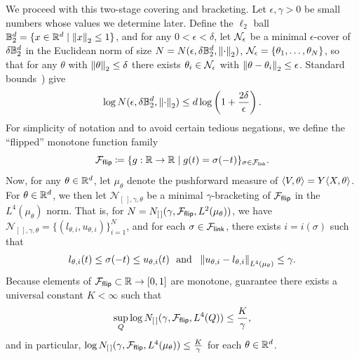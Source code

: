 We proceed with this two-stage covering and bracketing.
Let $\epsilon, \gamma > 0$ be small numbers whose values we determine
later.
Define the $\ell_2$ ball $\mathbb{B}_2^d = \{x \in \mathbb{R}^d \mid  \left\|{x}\right\|_2 \le 1\}$,
and for any $0 < \epsilon < \delta$, let
$\mathcal{N}_\epsilon$ be a minimal $\epsilon$-cover of $\delta \mathbb{B}_2^d$
in the Euclidean norm
of size $N = N(\epsilon, \delta \mathbb{B}_2^d, \left\|{\cdot}\right\|_2)$,
$\mathcal{N}_\epsilon = \{\theta_1, \ldots, \theta_N\}$, so that for
any $\theta$ with $\left\|{\theta}\right\|_2 \le \delta$ there exists
$\theta_i \in \mathcal{N}_\epsilon$ with $\left\|{\theta - \theta_i}\right\|_2 \le \epsilon$.
Standard bounds~\cite[Lemma~5.7]{Wainwright19}) give
\begin{align}
	\label{eqn:ball-covering-number}
	\log N(\epsilon, \delta \mathbb{B}_2^d, \left\|{\cdot}\right\|_2)
	\le d \log \left({1 + \frac{2\delta}{\epsilon}}\right).
\end{align}
For simplicity of notation and to avoid certain tedious negations, we define
the ``flipped'' monotone function family
\begin{equation*}
	\mathcal{F}_{\mathsf{flip}} \coloneqq \{g : \mathbb{R} \to \mathbb{R} \mid g(t) = \sigma(-t)\}_{
		\sigma \in \mathcal{F}_{\mathsf{link}}}.
\end{equation*}
Now, for any $\theta \in \mathbb{R}^d$, let
$\mu_\theta$
denote the pushforward measure of $\langle V, \theta\rangle = Y\langle X, \theta\rangle$.
For $\theta \in \mathbb{R}^d$, we then let
$\mathcal{N}_{[\,],\gamma, \theta}$ be a minimal
$\gamma$-bracketing of
$\mathcal{F}_{\mathsf{flip}}$
in the  $L^4(\mu_{\theta})$ norm. That is,
for $N = N_{[\,]}(\gamma, \mathcal{F}_{\mathsf{flip}}, L^2(\mu_\theta))$, we have
$\mathcal{N}_{[\,], \gamma, \theta}
= \{(l_{\theta, i}, u_{\theta, i})\}_{i = 1}^{N}$,
and for each $\sigma \in \mathcal{F}_{\mathsf{link}}$,
there exists $i = i(\sigma)$ such that
\begin{align*}
	l_{\theta, i}(t) \leq
	\sigma(-t) \leq
	u_{\theta, i}(t)
	~~ \mbox{and} ~~ \left\|{u_{\theta, i} - l_{\theta, i}}\right\|_{L^4(\mu_{\theta})}
	\leq \gamma.
\end{align*}
Because elements of $\mathcal{F}_{\mathsf{flip}} \subset \mathbb{R} \to [0, 1]$ are monotone,
\citet[Thm.~2.7.5]{VanDerVaartWe96} guarantee there
exists a universal constant $K < \infty$ such that
\begin{align}
	\label{eqn:monotone-covering-bound}
	\sup_Q \log N_{[\,]}(\gamma, \mathcal{F}_{\mathsf{flip}}, L^4(Q)) \leq \frac{K}{\gamma},
\end{align}
and in particular,
$\log N_{[\,]}(\gamma, \mathcal{F}_{\mathsf{flip}}, L^4(\mu_\theta)) \le \frac{K}{\gamma}$ for
each $\theta \in \mathbb{R}^d$.

